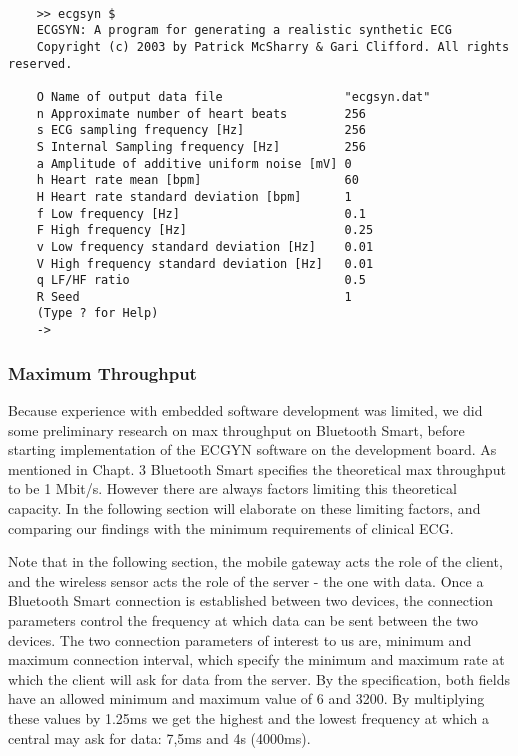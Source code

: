 \begin{lstlisting}[caption={ECGSYN menu}, label={lst:ecgsyn_terminal}]

    >> ecgsyn $
    ECGSYN: A program for generating a realistic synthetic ECG
    Copyright (c) 2003 by Patrick McSharry & Gari Clifford. All rights reserved.
     
    O Name of output data file                 "ecgsyn.dat"
    n Approximate number of heart beats        256
    s ECG sampling frequency [Hz]              256
    S Internal Sampling frequency [Hz]         256
    a Amplitude of additive uniform noise [mV] 0
    h Heart rate mean [bpm]                    60
    H Heart rate standard deviation [bpm]      1
    f Low frequency [Hz]                       0.1
    F High frequency [Hz]                      0.25
    v Low frequency standard deviation [Hz]    0.01
    V High frequency standard deviation [Hz]   0.01
    q LF/HF ratio                              0.5
    R Seed                                     1
    (Type ? for Help)
    ->

\end{lstlisting}

\subsubsection{Maximum Throughput} %
\label{ssub:maximum_throughput}

Because experience with embedded software development was limited, we did some preliminary research on max throughput on Bluetooth Smart, before starting implementation of the ECGYN software on the development board. As mentioned in Chapt. 3 Bluetooth Smart specifies the theoretical max throughput to be 1 Mbit/s. However there are always factors limiting this theoretical capacity. In the following section will elaborate on these limiting factors, and comparing our findings with the minimum requirements of clinical ECG.

Note that in the following section, the mobile gateway acts the role of the client, and the wireless sensor acts the role of the server - the one with data. Once a Bluetooth Smart connection is established between two devices, the connection parameters \cite{newRef_59} control the frequency at which data can be sent between the two devices. The two connection parameters of interest to us are, minimum and maximum connection interval, which specify the minimum and maximum rate at which the client will ask for data from the server. By the specification, both fields have an allowed minimum and maximum value of 6 and 3200. By multiplying these values by 1.25ms we get the highest and the lowest frequency at which a central may ask for data: 7,5ms and 4s (4000ms).

